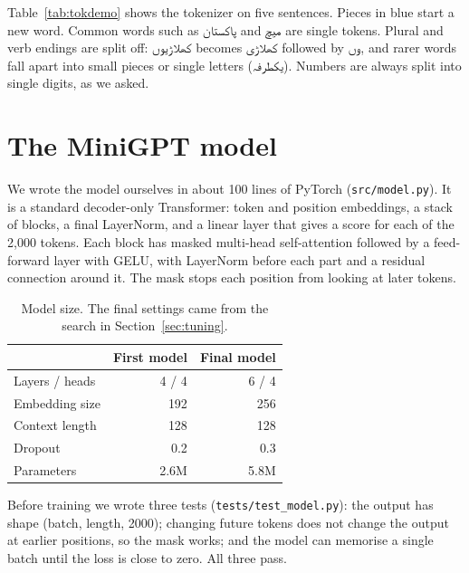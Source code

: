 \documentclass[11pt,a4paper]{article}
\newcommand{\ur}[1]{\texturdu{#1}}
\newcommand{\ws}[1]{\textcolor{wordstart}{#1}}
\begin{document}
Table~\ref{tab:tokdemo} shows the tokenizer on five sentences. Pieces in \ws{blue} start a new word. Common words such as \ur{پاکستان} and \ur{میچ} are single tokens. Plural and verb endings are split off: \ur{کھلاڑیوں} becomes \ur{کھلاڑی} followed by \ur{وں}, and rarer words fall apart into small pieces or single letters (\ur{یکطرفہ}). Numbers are always split into single digits, as we asked.

\begin{table}[H]
\centering
\small
\caption{Five example sentences, their token pieces (read right to left, separated by $|$) and the number of tokens. Blue pieces begin a word.}
\label{tab:tokdemo}
\end{table}

\section{The MiniGPT model}

We wrote the model ourselves in about 100 lines of PyTorch (\texttt{src/model.py}). It is a standard decoder-only Transformer: token and position embeddings, a stack of blocks, a final LayerNorm, and a linear layer that gives a score for each of the 2{,}000 tokens. Each block has masked multi-head self-attention followed by a feed-forward layer with GELU, with LayerNorm before each part and a residual connection around it. The mask stops each position from looking at later tokens.

\begin{table}[H]
\centering
\begin{tabular}{lrr}
\toprule
 & First model & Final model \\
\midrule
Layers / heads & 4 / 4 & 6 / 4 \\
Embedding size & 192 & 256 \\
Context length & 128 & 128 \\
Dropout & 0.2 & 0.3 \\
Parameters & 2.6M & 5.8M \\
\bottomrule
\end{tabular}
\caption{Model size. The final settings came from the search in Section~\ref{sec:tuning}.}
\end{table}

Before training we wrote three tests (\texttt{tests/test\_model.py}): the output has shape (batch, length, 2000); changing future tokens does not change the output at earlier positions, so the mask works; and the model can memorise a single batch until the loss is close to zero. All three pass.
\end{document}
